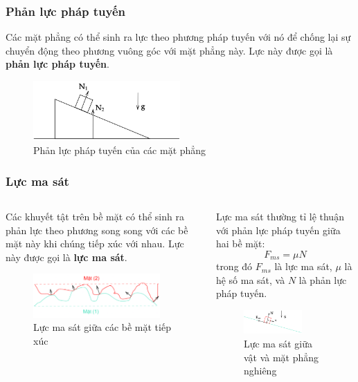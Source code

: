 \begin{frame}
    \frametitle{Phản lực pháp tuyến}
Các mặt phẳng có thể sinh ra lực theo phương pháp tuyến với nó để chống lại sự chuyển động theo phương vuông góc với mặt phẳng này. Lực này được gọi là \textbf{phản lực pháp tuyến}.
\begin{figure}
\centering
\includegraphics[width=0.5\textwidth]{Slides/Figure/wedge.png}
\caption{Phản lực pháp tuyến của các mặt phẳng}
\end{figure}
\end{frame}

\begin{frame}
    \frametitle{Lực ma sát}
    \begin{columns}
    \begin{column}{0.5\textwidth}
    Các khuyết tật trên bề mặt có thể sinh ra phản lực theo phương song song với các bề mặt này khi chúng tiếp xúc với nhau. Lực này được gọi là \textbf{lực ma sát}.
    \begin{figure}
        \centering
        \includegraphics[width=0.9\textwidth]{Slides/Figure/friction.png}
        \caption{Lực ma sát giữa các bề mặt tiếp xúc}
    \end{figure}
    \end{column}
    \begin{column}{0.5\textwidth}
    Lực ma sát thường tỉ lệ thuận với phản lực pháp tuyến giữa hai bề mặt:
    \begin{equation}
        F_{ms} = \mu N
    \end{equation}
    trong đó \(F_{ms}\) là lực ma sát, \(\mu\) là hệ số ma sát, và \(N\) là phản lực pháp tuyến.
    \begin{figure}
        \centering
        \includegraphics[width=0.7\textwidth]{Slides/Figure/slope.png}
        \caption{Lực ma sát giữa vật và mặt phẳng nghiêng}
    \end{figure}
    \end{column}
    \end{columns}
\end{frame}
